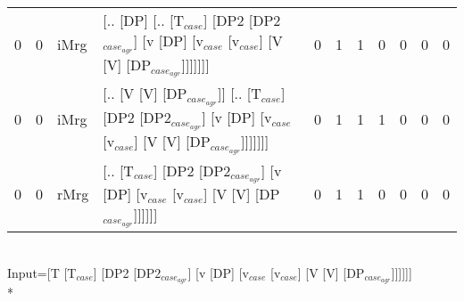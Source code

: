 \begin{tabularx}{\linewidth}{rrlXrrrrrrr}
   0 &   0 & iMrg & [.. [DP] [.. [T$_{case}$] [DP2 [DP2$_{case_{agr}}$] [v [DP] [v$_{case}$ [v$_{case}$] [V [V] [DP$_{case_{agr}}$]]]]]]]                                                                  &            0 &             1 &             1 &                  0 &              0 &              0 &            0 \\
   0 &   0 & iMrg & [.. [V [V] [DP$_{case_{agr}}$]] [.. [T$_{case}$] [DP2 [DP2$_{case_{agr}}$] [v [DP] [v$_{case}$ [v$_{case}$] [V [V] [DP$_{case_{agr}}$]]]]]]]                                                 &            0 &             1 &             1 &                  1 &              0 &              0 &            0 \\
   0 &   0 & rMrg & [.. [T$_{case}$] [DP2 [DP2$_{case_{agr}}$] [v [DP] [v$_{case}$ [v$_{case}$] [V [V] [DP$_{case_{agr}}$]]]]]]                                                                            &            0 &             1 &             1 &                  0 &              0 &              0 &            0 \\
\hline
\end{tabularx}\endgroup\\
\begingroup\scriptsize Input=[T [T$_{case}$] [DP2 [DP2$_{case_{agr}}$] [v [DP] [v$_{case}$ [v$_{case}$] [V [V] [DP$_{case_{agr}}$]]]]]]\\*
